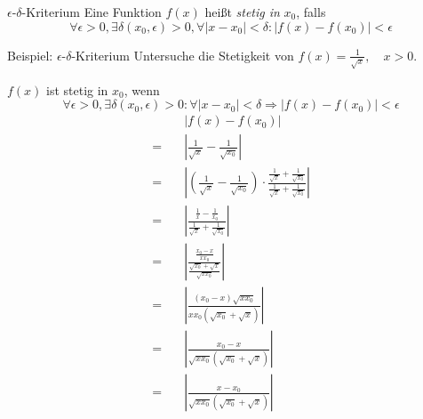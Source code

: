 \documentclass[german]{spicker}
\renewcommand{\abs}[1]{\left| #1 \right|}
\begin{document}
\begin{defi}{$\epsilon$-$\delta$-Kriterium}
    Eine Funktion $f(x)$ heißt \emph{stetig in} $x_0$, falls
    $$
        \forall \epsilon > 0, \exists \delta(x_0, \epsilon) > 0, \forall \abs{x-x_0} < \delta : \abs{f(x)-f(x_0)} < \epsilon
    $$
\end{defi}

\begin{bonus}{Beispiel: $\epsilon$-$\delta$-Kriterium}
    Untersuche die Stetigkeit von $f(x) = \frac{1}{\sqrt{x}}, \quad x > 0$.

    $f(x)$ ist stetig in $x_0$, wenn
    $$\forall \epsilon > 0, \exists \delta (x_0, \epsilon) > 0: \forall \abs{x-x_0} < \delta \Rightarrow \abs{f(x)-f(x_0)} < \epsilon$$
    $$
        \begin{aligned}
                       & \abs{f(x)-f(x_0)}                                                                                                                                        \\
            = \quad    & \abs{\frac{1}{\sqrt{x}}-\frac{1}{\sqrt{x_0}}}                                                                                                            \\
            = \quad    & \abs{\left(\frac{1}{\sqrt{x}}-\frac{1}{\sqrt{x_0}}\right) \cdot \frac{\frac{1}{\sqrt{x}}+\frac{1}{\sqrt{x_0}}}{\frac{1}{\sqrt{x}}+\frac{1}{\sqrt{x_0}}}} \\
            = \quad    & \abs{\frac{\frac{1}{x}-\frac{1}{x_0}}{\frac{1}{\sqrt{x}}+\frac{1}{\sqrt{x_0}}}}                                                                          \\
            = \quad    & \abs{\frac{\frac{x_0-x}{x x_0}}{\frac{\sqrt{x_0} + \sqrt{x}}{ \sqrt{x  x_0}}}}                                                                           \\
            = \quad    & \abs{ \frac{(x_0 - x)  \sqrt{x x_0} }{ x x_0  \left( \sqrt{x_0} + \sqrt{x} \right) } }                                                                   \\
            = \quad    & \abs{ \frac{x_0 - x }{ \sqrt{x x_0 } \left( \sqrt{x_0} + \sqrt{x} \right) } }                                                                            \\
            = \quad    & \abs{ \frac{x-x_0 }{ \sqrt{x x_0 } \left( \sqrt{x_0} + \sqrt{x} \right) } }                                                                              \\

\end{aligned}$$
\end{bonus}
\end{document}
